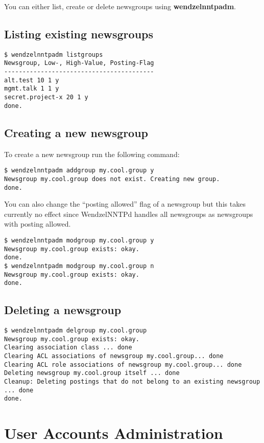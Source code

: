 You can either list, create or delete newsgroups using \textbf{wendzelnntpadm}.

\subsection{Listing existing newsgroups}

\begin{verbatim}
$ wendzelnntpadm listgroups
Newsgroup, Low-, High-Value, Posting-Flag
-----------------------------------------
alt.test 10 1 y
mgmt.talk 1 1 y
secret.project-x 20 1 y
done.
\end{verbatim}

\subsection{Creating a new newsgroup}

To create a new newsgroup run the following command:

\begin{verbatim}
$ wendzelnntpadm addgroup my.cool.group y
Newsgroup my.cool.group does not exist. Creating new group.
done.
\end{verbatim}

You can also change the ``posting allowed'' flag of a newsgroup but this takes currently no effect since WendzelNNTPd handles all newsgroups as newsgroups with posting allowed.

\begin{verbatim}
$ wendzelnntpadm modgroup my.cool.group y
Newsgroup my.cool.group exists: okay.
done.
$ wendzelnntpadm modgroup my.cool.group n
Newsgroup my.cool.group exists: okay.
done.
\end{verbatim}

\subsection{Deleting a newsgroup}

\begin{verbatim}
$ wendzelnntpadm delgroup my.cool.group
Newsgroup my.cool.group exists: okay.
Clearing association class ... done
Clearing ACL associations of newsgroup my.cool.group... done
Clearing ACL role associations of newsgroup my.cool.group... done
Deleting newsgroup my.cool.group itself ... done
Cleanup: Deleting postings that do not belong to an existing newsgroup ... done
done.
\end{verbatim}

\section{User Accounts Administration}

